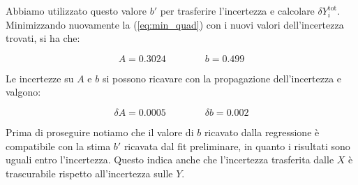 Abbiamo utilizzato questo valore $b'$ per trasferire l'incertezza e calcolare $\delta Y_i^{\text{tot}}$. Minimizzando nuovamente la 
(\ref{eq:min_quad}) con i nuovi valori dell'incertezza trovati, si ha che:

\begin{equation}
    A = 0.3024 \qquad \qquad b = 0.499
\end{equation}

Le incertezze su $A$ e $b$ si possono ricavare con la propagazione dell'incertezza e valgono:

\begin{equation}
    \delta A = 0.0005 \qquad \qquad \delta b = 0.002
\end{equation}

Prima di proseguire notiamo che il valore di $b$ ricavato dalla regressione è compatibile con la stima $b'$
ricavata dal fit preliminare, in quanto i risultati sono uguali entro l'incertezza. Questo indica anche che
l'incertezza trasferita dalle $X$ è trascurabile rispetto all'incertezza sulle $Y$.
